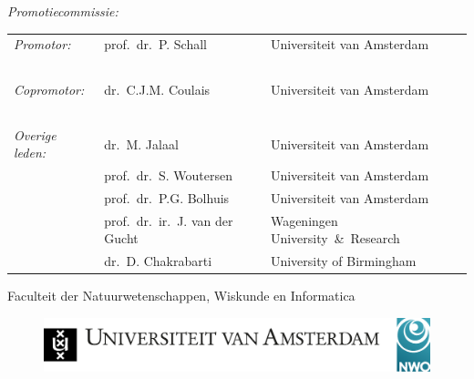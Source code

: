 
{\small \textit{Promotiecommissie:}} \\[0.2cm]

{ \footnotesize %
\begin{tabular}{@{}lll}
\textit{Promotor:}      & prof.~dr.~P. Schall    & Universiteit van Amsterdam\\
~                       & ~                      & ~                         \\
\textit{Copromotor:}    & dr.~C.J.M. Coulais     & Universiteit van Amsterdam\\
~                       & ~                      & ~                         \\
\textit{Overige leden:} & dr.~M. Jalaal          & Universiteit van Amsterdam\\
                        & prof.~dr.~S. Woutersen & Universiteit van Amsterdam\\
                        & prof.~dr.~P.G. Bolhuis & Universiteit van Amsterdam\\
                        & prof.~dr.~ir.~J. van der Gucht & Wageningen University~\&~Research \\
                        & dr.~D. Chakrabarti    & University of Birmingham \\
\end{tabular} 
}

\vspace*{0.8cm}

{\small Faculteit der Natuurwetenschappen, Wiskunde en Informatica}

\vspace*{\fill}

\begin{figure}[!h]
    \includegraphics[width=1.0\textwidth]{Sections/Preface/logos/full-logo.pdf}
\end{figure}

